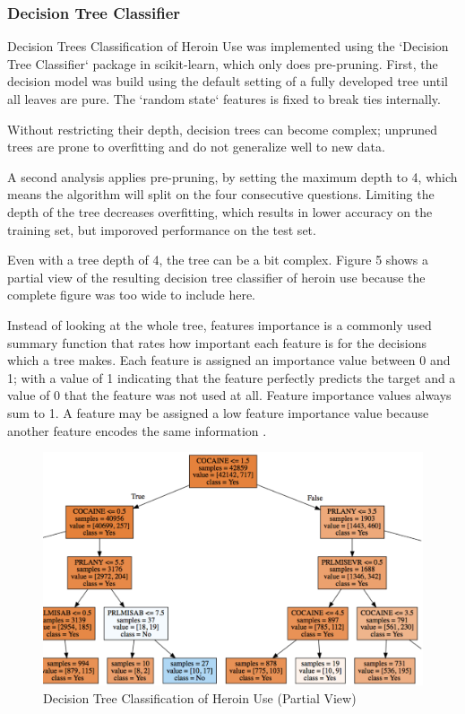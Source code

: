 \documentclass[sigconf]{acmart}
\begin{document}
\cite{raschka17}

\subsubsection{Decision Tree Classifier}

Decision Trees Classification of Heroin Use was implemented using the `Decision 
Tree Classifier` package in scikit-learn, which only does pre-pruning. First, 
the decision model was build using the default setting of a fully developed 
tree until all leaves are pure. The `random state` features is fixed to break 
ties internally. 

Without restricting their depth, decision trees can become complex; unpruned 
trees are prone to overfitting and do not generalize well to new data. 

A second analysis applies pre-pruning, by setting the maximum depth to 4, which
means the algorithm will split on the four consecutive questions. Limiting
the depth of the tree decreases overfitting, which results in lower accuracy
on the training set, but imporoved performance on the test set. 

Even with a  tree depth of 4, the tree can be a bit complex. Figure 5 shows a 
partial view of the resulting decision tree classifier of heroin use because 
the complete figure was too wide to include here.

Instead of looking at the whole tree, features importance is a commonly used 
summary function that rates how important each feature is for the decisions 
which a tree makes. Each feature is assigned an importance value between 0 and 1;
with a value of 1 indicating that the feature perfectly predicts the target and 
a value of 0 that the feature was not used at all. Feature importance values
always sum to 1. A feature may be assigned a low feature importance value
because another feature encodes the same information \cite{muller17}.



\begin{figure}[!ht]
  \centering\includegraphics[width=\columnwidth]{images/Figure5.pdf}
  \caption{Decision Tree Classification of Heroin Use (Partial View)}
  \label{f:Figure5}
\end{figure}
\end{document}
